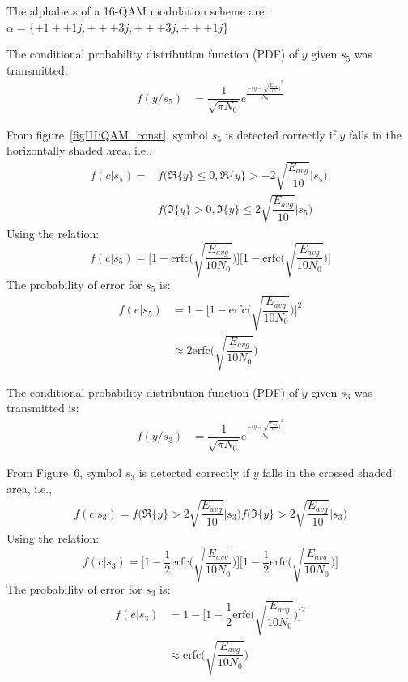 \noindent The alphabets of a 16-QAM modulation scheme are:\\ 
$ \alpha=\{\pm 1 + \pm 1j, \pm + \pm 3j, \pm + \pm 3j, \pm + \pm 1j\} $
\par The conditional probability distribution function (PDF) of $ y $ given $ s_5 $ was transmitted:
	\begin{align}
	f(y/s_5)&=\dfrac{1}{\sqrt{\pi N_0}}e^{\frac{{-\big ( y-\sqrt{\frac{E_{avg}}{10}}\big )}^2}{N_0}}
	\end{align}
	
		From figure~\ref{figIII:QAM_const}, symbol $ s_{5} $ is detected correctly if $ y $ falls in the horizontally shaded area, i.e.,
	\begin{align*}
	f(c|s_5)=&f \Bigg(\Re\{y\} \le 0,\Re\{y\}>-2\sqrt{\dfrac{E_{avg}}{10}} \Big|s_5 \Bigg ).\\
	&f\Bigg (\Im\{y\}>0,\Im\{y\}\leq 2\sqrt{\dfrac{E_{avg}}{10}} \Big| s_5 \Bigg )
	\end{align*}
		Using the relation:
	  \begin{equation}
	f(c|s_5)=\Bigg[ 1-\text{erfc}\Bigg( \sqrt{\dfrac{E_{avg}}{10N_0}} \Bigg)\Bigg]\Bigg[ 1-\text{erfc}\Bigg( \sqrt{\dfrac{E_{avg}}{10N_0}} \Bigg)\Bigg]
	\end{equation}
		The probability of error for $ s_5 $ is:
	\begin{align}
	f(e|s_5)&=1-\Bigg[ 1-\text{erfc}\Bigg( \sqrt{\dfrac{E_{avg}}{10N_0}} \Bigg)\Bigg]^2\\
	&\approx 2\text{erfc}\Bigg( \sqrt{\dfrac{E_{avg}}{10N_0}} \Bigg)
	\end{align}
	
	
		The conditional probability distribution function (PDF) of $ y $ given $ s_3 $ was transmitted is:
		\begin{align}
		f(y/s_3)&=\dfrac{1}{\sqrt{\pi N_0}}e^{\frac{{-\big ( y-\sqrt{\frac{E_{avg}}{10}}\big )}^2}{N_0}}
		\end{align}
		
		From Figure~6, symbol $ s_{3} $ is detected correctly if $ y $ falls in the crossed shaded area, i.e.,
		\begin{align*}
		f(c|s_3)=f \Bigg(\Re\{y\}>2\sqrt{\dfrac{E_{avg}}{10}} \Big|s_3 \Bigg )f\Bigg (\Im\{y\}> 2\sqrt{\dfrac{E_{avg}}{10}} \Big| s_3 \Bigg )
		\end{align*}
		Using the relation:
		\begin{equation}
		f(c|s_3)=\Bigg[ 1-\dfrac{1}{2}\text{erfc}\Bigg( \sqrt{\dfrac{E_{avg}}{10N_0}} \Bigg)\Bigg]\Bigg[ 1-\dfrac{1}{2}\text{erfc}\Bigg( \sqrt{\dfrac{E_{avg}}{10N_0}} \Bigg)\Bigg]
		\end{equation}
		The probability of error for $ s_3 $ is:
		\begin{align}
		f(e|s_3)&=1-\Bigg[ 1-\dfrac{1}{2}\text{erfc}\Bigg( \sqrt{\dfrac{E_{avg}}{10N_0}} \Bigg)\Bigg]^2\\
		&\approx \text{erfc}\Bigg( \sqrt{\dfrac{E_{avg}}{10N_0}} \Bigg)
		\end{align}
		
